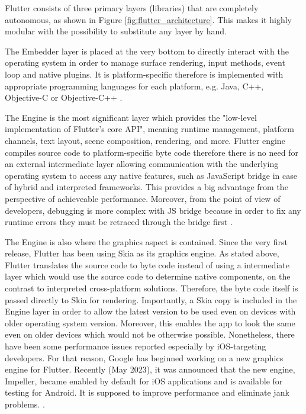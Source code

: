 Flutter consists of three primary layers (libraries) that are completely autonomous, as shown in Figure \ref{fig:flutter_architecture}. This makes it highly modular with the possibility to substitute any layer by hand.

The Embedder layer is placed at the very bottom to directly interact with the operating system in order to manage surface rendering, input methods, event loop and native plugins. It is platform-specific therefore is implemented with appropriate programming languages for each platform, e.g. Java, C++, Objective-C or Objective-C++ \cite{flutter_docs_architecture}.

The Engine is the most significant layer which provides the "low-level implementation of Flutter's core API", meaning runtime management, platform channels, text layout, scene composition, rendering, and more. Flutter engine compiles source code to platform-specific byte code therefore there is no need for an external intermediate layer allowing communication with the underlying operating system to access any native features, such as JavaScript bridge in case of hybrid and interpreted frameworks. This provides a big advantage from the perspective of achieveable performance. Moreover, from the point of view of developers, debugging is more complex with JS bridge because in order to fix any runtime errors they must be retraced through the bridge first \cite{flutter_docs_architecture,windmill_flutter_in_action}.

The Engine is also where the graphics aspect is contained. Since the very first release, Flutter has been using Skia as its graphics engine. As stated above, Flutter translates the source code to byte code instead of using a intermediate layer which would use the source code to determine native components, on the contrast to interpreted cross-platform solutions. Therefore, the byte code itself is passed directly to Skia for rendering. Importantly, a Skia copy is included in the Engine layer in order to allow the latest version to be used even on devices with older operating system version. Moreover, this enables the app to look the same even on older devices which would not be otherwise possible. Nonetheless, there have been some performance issues reported especially by iOS-targeting developers. For that reason, Google has beginned working on a new graphics engine for Flutter. Recently (May 2023), it was announced that the new engine, Impeller, became enabled by default for iOS applications and is available for testing for Android. It is supposed to improve performance and eliminate jank problems.
\cite{flutter_docs_architecture,flutter_impeller,kosinski_flutter_vs_rn_vs_qt}.

